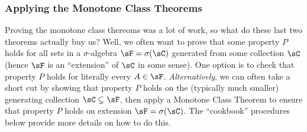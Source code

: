 \documentclass[12pt]{article}
\theoremstyle{plain}
\theoremstyle{definition}
\theoremstyle{remark}
\begin{document}
\clearpage
\subsubsection{Applying the Monotone Class Theorems}
\label{sec:cookbook}

Proving the monotone class thereoms was a lot of work, so what do
these last two theorems actually buy us?
Well, we often want to prove that some property $P$ holds for all sets
in a $\sigma$-algebra $\sF=\sigma(\sC)$ generated from some collection
$\sC$ (hence $\sF$ is an ``extension'' of $\sC$ in some sense).
One option is to check that property $P$ holds for literally every
$A\in\sF$. \emph{Alternatively}, we can often take a short cut by
showing that property $P$ holds on the (typically much smaller)
generating collection $\sC\subsetneq \sF$, then
apply a Monotone Class Theorem to ensure that property $P$ holds
on extension $\sF=\sigma(\sC)$.
The ``cookbook'' procedures below provide more details on how to do
this.
\end{document}
